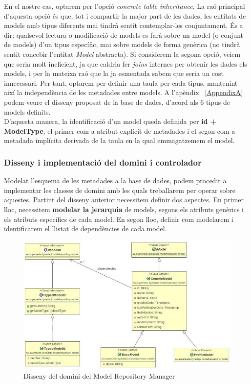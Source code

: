 En el nostre cas, optarem per l'opció \textit{concrete table inheritance}. La raó principal d'aquesta opció és que, tot i compartir la major part de les dades, les entitats de models amb tipus diferents mai tindrà sentit contemplar-les conjuntament. És a dir: qualsevol lectura o modificació de models es farà sobre un model (o conjunt de models) d'un tipus específic, mai sobre models de forma genèrica (no tindrà sentit concebir l'entitat \textit{Model} abstracta). Si considerem la segona opció, veiem que seria molt ineficient, ja que caldria fer \textit{joins} internes per obtenir les dades els models, i per la mateixa raó que la ja esmentada sabem que seria un cost innecessari. Per tant, optarem per definir una taula per cada tipus, mantenint així la independència de les metadades entre models. A l'apèndix ~\ref{AppendixA} podem veure el disseny proposat de la base de dades, d'acord als 6 tipus de models definits.\\

D'aquesta manera, la identificació d'un model queda definida per \textbf{id + ModelType}, el primer com a atribut explícit de metadades i el segon com a metadada implícita derivada de la taula en la qual emmagatzemem el model.

\subsubsection{Disseny i implementació del domini i controlador}

Modelat l'esquema de les metadades a la base de dades, podem procedir a implementar les classes de domini amb les quals treballarem per operar sobre aquestes. Partint del disseny anterior necessitem definir dos aspectes. En primer lloc, necessitem \textbf{modelar la jerarquia} de models, segons els atributs genèrics i els atributs específics de cada model. En segon lloc, definir com modelarem i identificarem el llistat de dependències de cada model.\\

\begin{figure}
\centering
\includegraphics[width=14cm]{Figures/Figure21}
\decoRule
\caption{Disseny del domini del Model Repository Manager}
\label{fig:Figura21}
\end{figure}


